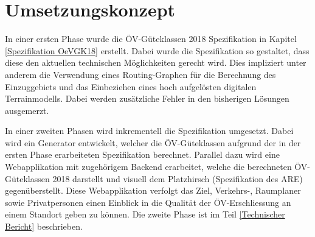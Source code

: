 
\section{Umsetzungskonzept}
\label{Umsetzungskonzept}

In einer ersten Phase wurde die \acs{ÖV}-Güteklassen 2018 Spezifikation in Kapitel \ref{Spezifikation OeVGK18} erstellt.
Dabei wurde die Spezifikation so gestaltet, dass diese den aktuellen technischen Möglichkeiten gerecht wird.
Dies impliziert unter anderem die Verwendung eines Routing-Graphen für die Berechnung des Einzuggebiets und das Einbeziehen eines hoch aufgelösten digitalen Terrainmodells.
Dabei werden zusätzliche Fehler in den bisherigen Lösungen ausgemerzt.

In einer zweiten Phasen wird inkrementell die Spezifikation umgesetzt.
Dabei wird ein Generator entwickelt, welcher die \acs{ÖV}-Güteklassen aufgrund der in der ersten Phase erarbeiteten Spezifikation berechnet.
Parallel dazu wird eine Webapplikation mit zugehörigem Backend erarbeitet, welche die berechneten \acs{ÖV}-Güteklassen 2018 darstellt und visuell dem Platzhirsch (Spezifikation des \acl{ARE}) gegenüberstellt.
Diese Webapplikation verfolgt das Ziel, Verkehrs-, Raumplaner sowie Privatpersonen einen Einblick in die Qualität der ÖV-Erschliessung an einem Standort geben zu können.
Die zweite Phase ist im Teil \ref{Technischer Bericht} beschrieben.

